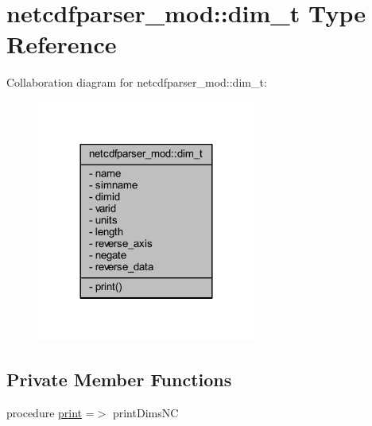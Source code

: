 \hypertarget{structnetcdfparser__mod_1_1dim__t}{}\section{netcdfparser\+\_\+mod\+:\+:dim\+\_\+t Type Reference}
\label{structnetcdfparser__mod_1_1dim__t}


Collaboration diagram for netcdfparser\+\_\+mod\+:\+:dim\+\_\+t\+:\nopagebreak
\begin{figure}[H]
\begin{center}
\leavevmode
\includegraphics[width=204pt]{structnetcdfparser__mod_1_1dim__t__coll__graph}
\end{center}
\end{figure}
\subsection*{Private Member Functions}
\begin{DoxyCompactItemize}
\item 
procedure \mbox{\hyperlink{structnetcdfparser__mod_1_1dim__t_aeb8d02051698385d0c46029a9a39c30f}{print}} =$>$ print\+Dims\+NC
\end{DoxyCompactItemize}
